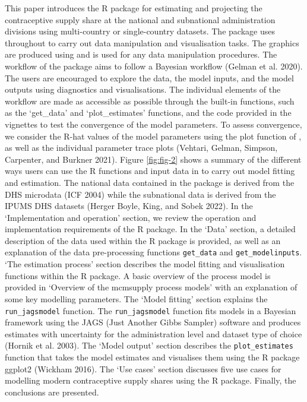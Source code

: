 This paper introduces the R package  for estimating and projecting the contraceptive supply share at the national and subnational administration divisions using multi-country or single-country datasets. The package uses  throughout to carry out data manipulation and visualisation tasks. The graphics are produced using  and  is used for any data manipulation procedures. The workflow of the package aims to follow a Bayesian workflow (Gelman et al. 2020). The users are encouraged to explore the data, the model inputs, and the model outputs using diagnostics and visualisations. The individual elements of the workflow are made as accessible as possible through the built-in functions, such as the `get\_data' and `plot\_estimates' functions, and the code provided in the vignettes to test the convergence of the model parameters. To assess convergence, we consider the R-hat values of the model parameters using the plot function of , as well as the individual parameter trace plots (Vehtari, Gelman, Simpson, Carpenter, and Burkner 2021). Figure \ref{fig:fig-2} shows a summary of the different ways users can use the R functions and input data in  to carry out model fitting and estimation. The national data contained in the package is derived from the DHS microdata (ICF 2004) while the subnational data is derived from the IPUMS DHS datasets (Herger Boyle, King, and Sobek 2022). In the `Implementation and operation' section, we review the operation and implementation requirements of the  R package. In the `Data' section, a detailed description of the data used within the  R package is provided, as well as an explanation of the data pre-processing functions \texttt{get\_data} and \texttt{get\_modelinputs}. `The estimation process' section describes the model fitting and visualisation functions within the  R package. A basic overview of the process model is provided in `Overview of the mcmsupply process models' with an explanation of some key modelling parameters. The `Model fitting' section explains the \texttt{run\_jagsmodel} function. The \texttt{run\_jagsmodel} function fits models in a Bayesian framework using the JAGS (Just Another Gibbs Sampler) software and produces estimates with uncertainty for the administration level and dataset type of choice (Hornik et al. 2003). The `Model output' section describes the \texttt{plot\_estimates} function that takes the model estimates and visualises them using the R package ggplot2 (Wickham 2016). The `Use cases' section discusses five use cases for modelling modern contraceptive supply shares using the  R package. Finally, the conclusions are presented.

